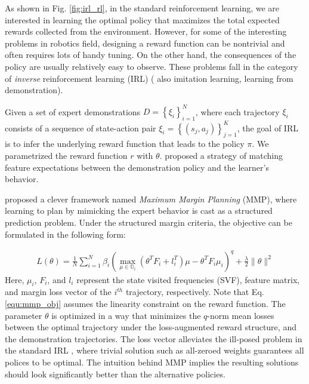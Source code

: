 \documentclass[../thesis.tex]{subfiles}
\begin{document}
As shown in Fig. \ref{fig:irl_rl}, in the standard reinforcement learning, we are interested in learning the optimal policy that maximizes the total expected rewards collected from the environment.
However, for some of the interesting problems in robotics field, designing a reward function can be nontrivial and often requires lots of handy tuning.
On the other hand, the consequences of the policy are usually relatively easy to observe.
These problems fall in the category of \textit{inverse} reinforcement learning (IRL) \cite{ng2000algorithms} ( also imitation learning, learning from demonstration).
 
 
 
Given a set of expert demonstrations $D=\left\{ \xi_i \right\}_{i=1}^{N}$, where each trajectory $\xi_i$ consists of a sequence of state-action pair $\xi_i = \left\{ (s_j, a_j) \right\}_{j=1}^{K}$, the goal of IRL is to infer the underlying reward function that leads to the policy $\pi$.
We parametrized the reward function $r$ with $\theta$. \citet{abbeel2004apprenticeship} proposed a strategy of matching feature expectations between the demonstration policy and the learner's behavior.
 
\citet{ratliff2006maximum} proposed a clever framework named \textit{Maximum Margin Planning} (MMP), where learning to plan by mimicking the expert behavior is cast as a structured prediction problem. Under the structured margin criteria, the objective can be formulated in the following form:
 
\begin{align}
L(\theta) = \frac{1}{N} \sum^{N}_{i=1} \beta_i ( \max_{\mu \in \mathbb{G}_i}(\theta^T F_i + l_i^T)\mu - \theta^TF_i\mu_i )^q +  \frac{\lambda}{2} \| \theta \|^2 \label{equ:mmp_obj}
\end{align}
Here, $\mu_i$, $F_i$, and $l_i$ represent the state visited frequencies (SVF), feature matrix, and margin loss vector of the $i^{th}$ trajectory, respectively.
Note that Eq. \ref{equ:mmp_obj} assumes the linearity constraint on the reward function.
The parameter $\theta$ is optimized in a way that minimizes the $q$-norm mean losses between the optimal trajectory under the loss-augmented reward structure, and the demonstration trajectories.
The loss vector alleviates the ill-posed problem in the standard IRL \cite{abbeel2004apprenticeship}, where trivial solution such as all-zeroed weights guarantees all polices to be optimal.
The intuition behind MMP implies the resulting solutions should look significantly better than the alternative policies.
 
\end{document}
